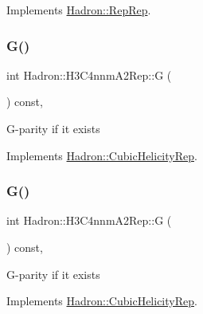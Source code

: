 Implements \mbox{\hyperlink{structHadron_1_1RepRep_a92c8802e5ed7afd7da43ccfd5b7cd92b}{Hadron\+::\+Rep\+Rep}}.

\mbox{\label{structHadron_1_1H3C4nnmA2Rep_a76c3746d753d21a46a22af12a8bcc087}} 
\subsubsection{\texorpdfstring{G()}{G()}\hspace{0.1cm}{\footnotesize\ttfamily [1/3]}}
{\footnotesize\ttfamily int Hadron\+::\+H3\+C4nnm\+A2\+Rep\+::G (\begin{DoxyParamCaption}{ }\end{DoxyParamCaption}) const\hspace{0.3cm}{\ttfamily [inline]}, {\ttfamily [virtual]}}

G-\/parity if it exists 

Implements \mbox{\hyperlink{structHadron_1_1CubicHelicityRep_a50689f42be1e6170aa8cf6ad0597018b}{Hadron\+::\+Cubic\+Helicity\+Rep}}.

\mbox{\label{structHadron_1_1H3C4nnmA2Rep_a76c3746d753d21a46a22af12a8bcc087}} 
\subsubsection{\texorpdfstring{G()}{G()}\hspace{0.1cm}{\footnotesize\ttfamily [2/3]}}
{\footnotesize\ttfamily int Hadron\+::\+H3\+C4nnm\+A2\+Rep\+::G (\begin{DoxyParamCaption}{ }\end{DoxyParamCaption}) const\hspace{0.3cm}{\ttfamily [inline]}, {\ttfamily [virtual]}}

G-\/parity if it exists 

Implements \mbox{\hyperlink{structHadron_1_1CubicHelicityRep_a50689f42be1e6170aa8cf6ad0597018b}{Hadron\+::\+Cubic\+Helicity\+Rep}}.

\mbox{\label{structHadron_1_1H3C4nnmA2Rep_a76c3746d753d21a46a22af12a8bcc087}} 
